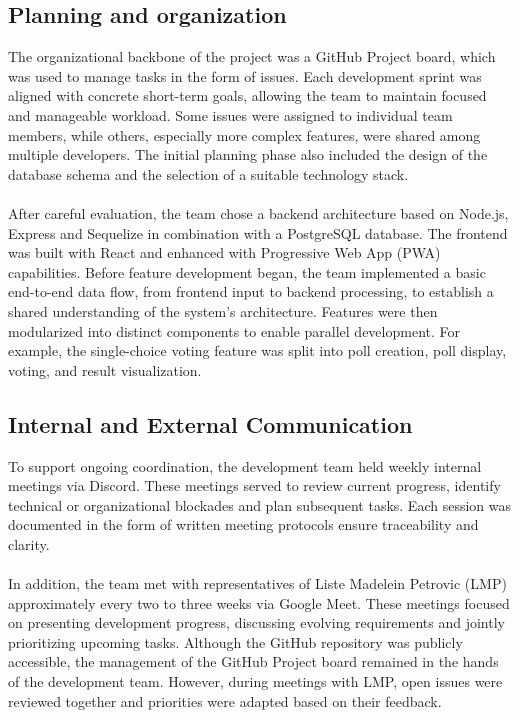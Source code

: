 \documentclass[a4paper,12pt]{report}
\begin{document}
\subsection{Planning and organization}
The organizational backbone of the project was a GitHub Project board, which was used to manage tasks in the form of issues. Each development sprint was aligned with concrete short-term goals, allowing the team to maintain focused and manageable workload. Some issues were assigned to individual team members, while others, especially more complex features, were shared among multiple developers. The initial planning phase also included the design of the database schema and the selection of a suitable technology stack.\\\\
After careful evaluation, the team chose a backend architecture based on Node.js, Express and Sequelize in combination with a PostgreSQL database. The frontend was built with React and enhanced with Progressive Web App (PWA) capabilities. Before feature development began, the team implemented a basic end-to-end data flow, from frontend input to backend processing, to establish a shared understanding of the system's architecture. Features were then modularized into distinct components to enable parallel development. For example, the single-choice voting feature was split into poll creation, poll display, voting, and result visualization.
\subsection{Internal and External Communication}
To support ongoing coordination, the development team held weekly internal meetings via Discord. These meetings served to review current progress, identify technical or organizational blockades and plan subsequent tasks. Each session was documented in the form of written meeting protocols ensure traceability and clarity.\\\\
In addition, the team met with representatives of Liste Madelein Petrovic (LMP) approximately every two to three weeks via Google Meet. These meetings focused on presenting development progress, discussing evolving requirements and jointly prioritizing upcoming tasks. Although the GitHub repository was publicly accessible, the management of the GitHub Project board remained in the hands of the development team. However, during meetings with LMP, open issues were reviewed together and priorities were adapted based on their feedback.
\end{document}

